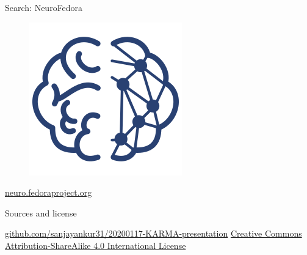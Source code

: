 \begin{frame}[c]{Search: NeuroFedora}
  \begin{figure}[h]
    \centering
    \includegraphics[keepaspectratio,height=0.5\textheight]{99_images/NeuroFedoraLogo01.png}
  \end{figure}
  \begin{center}
    \url{neuro.fedoraproject.org}
  \end{center}
\end{frame}
\begin{frame}[c]{Sources and license}
  \begin{center}
    \href{https://github.com/sanjayankur31/20200117-KARMA-presentation}{github.com/sanjayankur31/20200117-KARMA-presentation}\vspace{1cm}
    \href{http://creativecommons.org/licenses/by-sa/4.0/}{Creative Commons Attribution-ShareAlike 4.0 International License}
  \end{center}
\end{frame}

